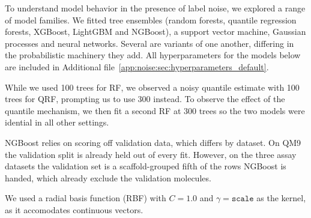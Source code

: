 
To understand model behavior in the presence of label noise, we explored a range of model families. We fitted tree ensembles (random forests, quantile regression forests, XGBoost, LightGBM and NGBoost), a support vector machine, Gaussian processes and neural networks. Several are variants of one another, differing in the probabilistic machinery they add. All hyperparameters for the models below are included in Additional file~\ref{app:noise:sec:hyperparameters_default}.

While we used 100 trees for RF, we observed a noisy quantile estimate with 100 trees for QRF, prompting us to use 300 instead. To observe the effect of the quantile mechanism, we then fit a second RF at 300 trees so the two models were idential in all other settings.

NGBoost relies on scoring off validation data, which differs by dataset. On QM9 the validation split is already held out of every fit. However, on the three assay datasets the validation set is a scaffold-grouped fifth of the rows NGBoost is handed, which already exclude the validation molecules.

We used a radial basis function (RBF) with $C = 1.0$ and $\gamma = \texttt{scale}$ as the kernel, as it accomodates continuous vectors.

